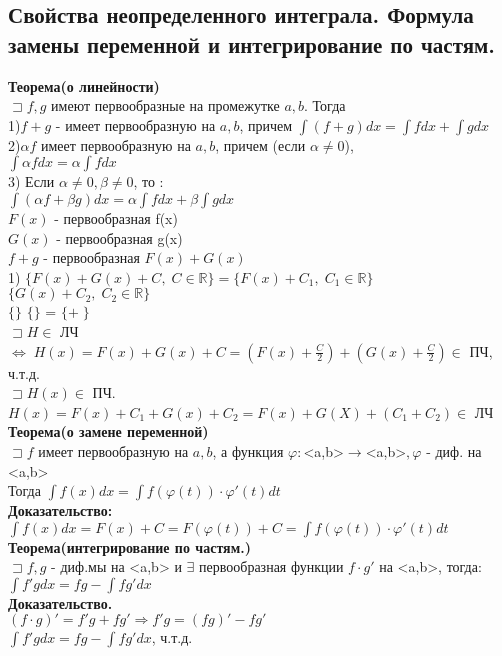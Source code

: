 \documentclass[14pt]{article}
\begin{document}
	\subsection{Свойства неопределенного интеграла. Формула замены переменной и интегрирование по частям.} 
	\textbf{Теорема(о линейности)} \\
	$\sqsupset f,g$ имеют первообразные на промежутке $a,b$. Тогда \\
	1)$f+g$ - имеет первообразную на $a,b$, причем $\int (f+g) dx = \int f dx + \int g dx$ \\
	2)$\alpha f$ имеет первообразную на $a,b$, причем (если $\alpha \neq 0$), \\
	$\int \alpha f dx = \alpha \int f dx$ \\
	3) Если $\alpha \neq 0 , \beta \neq 0 $, то : \\
	$\int(\alpha f + \beta g)dx = \alpha \int f dx + \beta \int g dx$ \\
	$F(x)$ - первообразная f(x) \\
	$G(x)$ - первообразная g(x) \\
	$f+g$ - первообразная $F(x) + G(x)$ \\
	1) $\{F(x) + G(x)+ C,\; C \in \mathbb{R} \} = \{F(x) + C_1, \; C_1 \in \mathbb{R} \}$ \fbox{+} $\{ G(x) + C_2, \; C_2 \in \mathbb{R} \}$ \\
	$\{ $\frownie$  \}$ \fbox{+} $\{ $\smiley$ \}$ = $\{ $\smiley$ + $\frownie$  \; \}$ \\
	$\sqsupset H \in$ ЛЧ $\iff \; H(x) = F(x) + G(x) + C = (F(x) + \frac{C}{2}) + (G(x) + \frac{C}{2}) \in $ ПЧ, ч.т.д. \\
	$\sqsupset H(x) \in$ ПЧ. $H(x) = F(x) + C_1 + G(x) + C_2 = F(x) + G(X) + (C_1 + C_2) \in $ ЛЧ  \\
	\textbf{Теорема(о замене переменной)} \\
	$\sqsupset f$ имеет первообразную на $a,b$, а функция $\varphi:$<a,b>$ \rightarrow $<a,b>$, \varphi$ - диф. на <a,b> \\
	Тогда $\int f(x)dx = \int f(\varphi(t))\cdot \varphi'(t)dt$\\
	\textbf{Доказательство:} \\
	$\int f(x)dx = F(x) + C = F(\varphi(t)) + C= \int f(\varphi(t))\cdot \varphi'(t) dt$ \\
	\textbf{Теорема(интегрирование по частям.)} \\
	$\sqsupset f,g$ - диф.мы на <a,b> и $\exists$ первообразная функции $f\cdot g'$ на <a,b>, тогда: \\
	$\int f'gdx=fg-\int fg'dx$ \\
	\textbf{Доказательство.} \\
	$(f\cdot g)' = f'g + fg' \Rightarrow f'g=(fg)'-fg'$ \\
	$\int f'gdx = fg - \int fg'dx$, ч.т.д. \\
\end{document}
